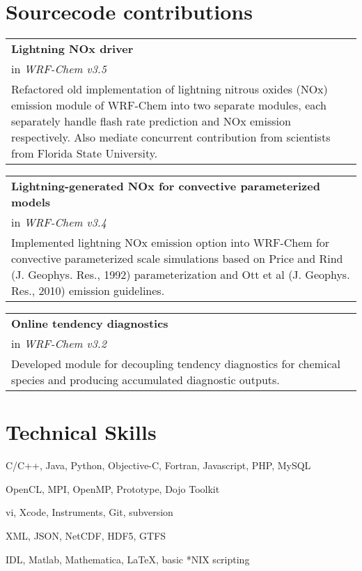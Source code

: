 \documentclass[overlap,12pt,centered]{res}
\makeatletter
\newcommand{\block}{\begin{tabular}{@{}p{6.5in}}}
\makeatother
\begin{document}
\begin{resume}
		\section{\sc Sourcecode contributions}
		
		\block
		{\bf Lightning NOx driver} \\
		in {\it WRF-Chem v3.5} \\
		Refactored old implementation of lightning nitrous oxides (NOx) emission module of WRF-Chem into two separate modules, each separately handle flash rate prediction and NOx emission respectively. Also mediate concurrent contribution from scientists from Florida State University.
		\end{tabular}
		
		\block
		{\bf Lightning-generated NOx for convective parameterized models} \\
		in {\it WRF-Chem v3.4} \\
		Implemented lightning NOx emission option into WRF-Chem for convective parameterized scale simulations based on Price and Rind (J. Geophys. Res., 1992) parameterization and Ott et al (J. Geophys. Res., 2010) emission guidelines.
		\end{tabular}
		
		\block
		{\bf Online tendency diagnostics} \\
		in {\it WRF-Chem v3.2} \\
		Developed module for decoupling tendency diagnostics for chemical species and producing accumulated diagnostic outputs.
		\end{tabular}
		
		\section{\sc Technical Skills}\vspace{.15in}
		\begin{description}
		\setlength{\itemsep}{-.02in}
			\item[Languages:] C/C++, Java, Python, Objective-C, Fortran, Javascript, PHP, MySQL
			\item[Frameworks and libraries:]  OpenCL, MPI, OpenMP, Prototype, Dojo Toolkit
			\item[IDEs and tools:] vi, Xcode, Instruments, Git, subversion
			\item[Data formats:] XML, JSON, NetCDF, HDF5, GTFS
			\item[Other tools:] IDL, Matlab, Mathematica, \LaTeX, basic *NIX scripting
		\end{description}\shrink
		

\end{resume}
\end{document}
